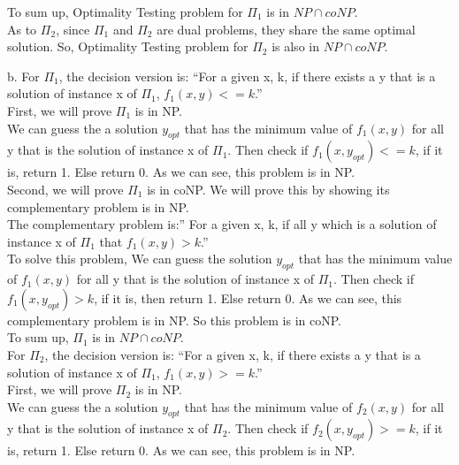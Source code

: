 \documentclass[12pt]{article}
\begin{document}
To sum up, Optimality Testing problem for $\Pi_1$ is in $NP \cap
coNP$. \\

As to $\Pi_2$, since $\Pi_1$ and $\Pi_2$ are dual problems, they share
the same optimal solution. So, Optimality Testing problem for $\Pi_2$
is also in $NP \cap coNP$.

b. For $\Pi_1$, the decision version is: ``For a given x, k, if there
exists a y that is a solution of instance x of $\Pi_1$,  $f_1(x,y) <=
k$.'' \\

First, we will prove $\Pi_1$ is in NP. \\

We can guess the a solution $y_{opt}$ that has the minimum value of
$f_1(x,y)$ for all y that is the solution of instance x of
$\Pi_1$. Then check if $f_1(x, y_{opt}) <= k$, if it is, return
1. Else return 0. As we can see, this problem is in NP. \\

Second, we will prove $\Pi_1$ is in coNP. We will prove this by
showing its complementary problem is in NP. \\

The complementary problem is:'' For a given x, k, if all y which is a
solution of instance x of $\Pi_1$ that $f_1(x, y) > k$.'' \\

To solve this problem, We can guess the solution $y_{opt}$ that has
the minimum value of $f_1(x,y)$ for all y that is the solution of
instance x of $\Pi_1$. Then check if $f_1(x, y_{opt}) > k$, if it is,
then return 1. Else return 0. As we can see, this complementary
problem is in NP. So this problem is in coNP. \\

To sum up, $\Pi_1$ is in $NP \cap coNP$. \\

For $\Pi_2$, the decision version is: ``For a given x, k, if there
exists a y that is a solution of instance x of $\Pi_1$,  $f_1(x,y) >=
k$.'' \\

First, we will prove $\Pi_2$ is in NP. \\

We can guess the a solution $y_{opt}$ that has the minimum value of
$f_2(x,y)$ for all y that is the solution of instance x of
$\Pi_2$. Then check if $f_2(x, y_{opt}) >= k$, if it is, return
1. Else return 0. As we can see, this problem is in NP. \\
\end{document}
